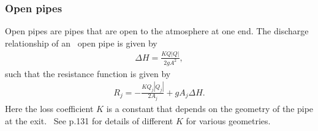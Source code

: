 \subsubsection{Open pipes}

Open pipes are pipes that are open to the atmosphere at one end. The discharge relationship of an \ 
open pipe is given by 
\begin{align}
    \Delta H = \frac{K Q |Q|}{2 g A^2},
\end{align}
such that the resistance function is given by
\begin{align}
    R_j = - \frac{K Q_j |Q_j|}{2 A_j} + g A_j \Delta H.
\end{align}
Here the loss coefficient $K$ is a constant that depends on the geometry of the pipe at the exit. \
See \cite{rennels22} p.131 for details of different $K$ for various geometries.


